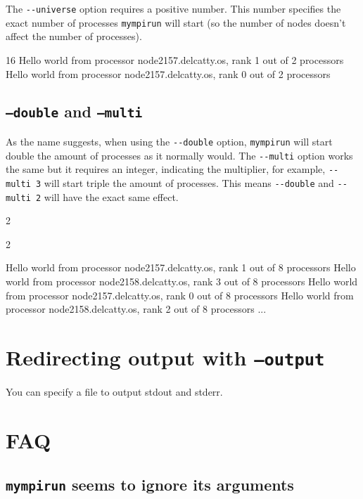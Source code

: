 The \lstinline|--universe| option requires a positive number. This number specifies
the exact number of processes \lstinline|mympirun| will start
(so the number of nodes doesn't affect the number of processes).

\begin{prompt}
16
Hello world from processor node2157.delcatty.os, rank 1 out of 2 processors
Hello world from processor node2157.delcatty.os, rank 0 out of 2 processors
\end{prompt}

\subsection{\texttt{--double} and \texttt{--multi}}

As the name suggests, when using the \lstinline|--double| option, \lstinline|mympirun| will start double
the amount of processes as it normally would. The \lstinline|--multi| option works the same
but it requires an integer, indicating the multiplier, for example, \lstinline|--multi 3| will
start triple the amount of processes. This means \lstinline|--double| and \lstinline|--multi 2| will have
the exact same effect.

\begin{prompt}
2

2

Hello world from processor node2157.delcatty.os, rank 1 out of 8 processors
Hello world from processor node2158.delcatty.os, rank 3 out of 8 processors
Hello world from processor node2157.delcatty.os, rank 0 out of 8 processors
Hello world from processor node2158.delcatty.os, rank 2 out of 8 processors
...
\end{prompt}

\section{Redirecting output with \texttt{--output}}

You can specify a file to output stdout and stderr.

\section{FAQ}

\subsection{\texttt{mympirun} seems to ignore its arguments}

